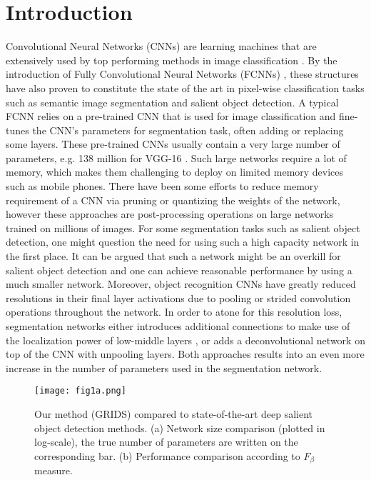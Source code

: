 \documentclass[a4paper,conference]{IEEEtran}
\begin{document}
\IEEEpeerreviewmaketitle



\section{Introduction}
{C}{onvolutional} Neural Networks (CNNs) are learning machines that are extensively used by top performing methods in image classification \cite{Krizhevsky,Simonyan,Szegedy,He}.
By the introduction of Fully Convolutional Neural Networks (FCNNs) \cite{Long}, these structures have also proven to constitute the state of the art in pixel-wise classification tasks such as semantic image segmentation and salient object detection.
A typical FCNN relies on a pre-trained CNN that is used for image classification and fine-tunes the CNN's parameters for segmentation task, often adding or replacing some layers.
These pre-trained CNNs usually contain a very large number of parameters, e.g. 138 million for VGG-16 \cite{Simonyan}.
Such large networks require a lot of memory, which makes them challenging to deploy on limited memory devices such as mobile phones.
There have been some efforts to reduce memory requirement of a CNN via pruning \cite{Hanc} or quantizing \cite{Guptac} the weights of the network, however these approaches are post-processing operations on large networks trained on millions of images.
For some segmentation tasks such as salient object detection, one might question the need for using such a high capacity network in the first place.
It can be argued that such a network might be an overkill for salient object detection and one can achieve reasonable performance by using a much smaller network.
Moreover, object recognition CNNs have greatly reduced resolutions in their final layer activations due to pooling or strided convolution operations throughout the network.
In order to atone for this resolution loss, segmentation networks either introduces additional connections to make use of the localization power of low-middle layers \cite{Long,Hariharan}, or adds a deconvolutional network on top of the CNN \cite{Badrinarayanan, Noh} with unpooling layers.
Both approaches results into an even more increase in the number of parameters used in the segmentation network.

\begin{figure}[!t]
\texttt{[image: fig1a.png]}


\caption{Our method (GRIDS) compared to state-of-the-art deep salient object detection methods. (a) Network size comparison (plotted in log-scale), the true number of parameters are written on the corresponding bar. (b) Performance comparison according to $F_\beta$ measure.}
\label{fig0}
\end{figure}
\end{document}
